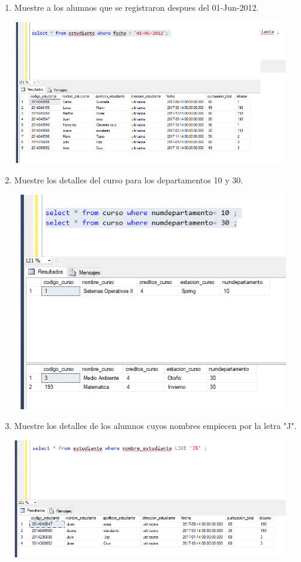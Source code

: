 \documentclass[12pt,letterpaper]{article}
\begin{document}
\begin{enumerate}[1.]
    
    \item Muestre a los alumnos que se registraron despues del 01-Jun-2012.
    

\begin{center}
\includegraphics[width=12cm]{./IMAGENES/imagen4}
\end{center}

    \item Muestre los detalles del curso para los departamentos 10 y 30. 
    
  
\begin{center}
\includegraphics[width=12cm]{./IMAGENES/imagen5}
\end{center}

    \item Muestre los detalles de los alumnos cuyos nombres empiecen por la letra "J". 
  
\begin{center}
\includegraphics[width=12cm]{./IMAGENES/imagen6}
\end{center}




\end{enumerate}
\end{document}
